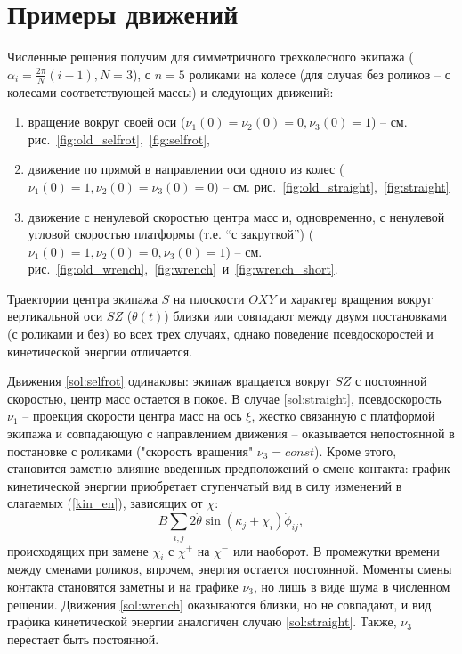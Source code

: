 \section{Примеры движений}

Численные решения получим для симметричного трехколесного экипажа ($\alpha_i = \frac{2\pi}{N}(i - 1), N = 3$), с $n = 5$ роликами на колесе (для случая без роликов -- с колесами соответствующей массы) и следующих движений:
\begin{enumerate}
  \item \label{sol:selfrot} вращение вокруг своей оси ($\nu_1(0) = \nu_2(0) = 0, \nu_3(0) = 1$) -- см. рис.~\ref{fig:old_selfrot},~\ref{fig:selfrot},
  \item \label{sol:straight} движение по прямой в направлении оси одного из колес ($\nu_1(0) = 1, \nu_2(0) = \nu_3(0) = 0$) -- см. рис.~\ref{fig:old_straight},~\ref{fig:straight}
  \item \label{sol:wrench} движение с ненулевой скоростью центра масс и, одновременно, с ненулевой угловой скоростью платформы (т.е. ``с закруткой'') ($\nu_1(0) = 1, \nu_2(0) = 0, \nu_3(0) = 1$) -- см. рис.~\ref{fig:old_wrench},~\ref{fig:wrench}~и~\ref{fig:wrench_short}.
\end{enumerate}

Траектории центра экипажа $S$ на плоскости $OXY$ и характер вращения вокруг вертикальной оси $SZ$ ($\theta(t)$) близки или совпадают между двумя постановками (с роликами и без) во всех трех случаях, однако поведение псевдоскоростей и кинетической энергии отличается.

Движения \ref{sol:selfrot} одинаковы: экипаж вращается вокруг $SZ$ с постоянной скоростью, центр масс остается в покое. В случае \ref{sol:straight}, псевдоскорость $\nu_1$ -- проекция скорости центра масс на ось $\xi$, жестко связанную с платформой экипажа и совпадающую с направлением движения -- оказывается непостоянной в постановке с роликами ("скорость вращения" $\nu_3 = const$). Кроме этого, становится заметно влияние введенных предположений о смене контакта: график кинетической энергии приобретает ступенчатый вид в силу изменений в слагаемых (\ref{kin_en}), зависящих от $\chi$: 
$$B\sum_{i,j}2\dot{\theta}\sin(\kappa_j + \chi_i)\dot{\phi}_{ij},$$
происходящих при замене $\chi_i$ с $\chi^+$ на $\chi^-$ или наоборот. В промежутки времени между сменами роликов, впрочем, энергия остается постоянной. Моменты смены контакта становятся заметны и на графике $\nu_3$, но лишь в виде шума в численном решении. Движения \ref{sol:wrench} оказываются близки, но не совпадают, и вид графика кинетической энергии аналогичен случаю \ref{sol:straight}. Также, $\nu_3$ перестает быть постоянной.